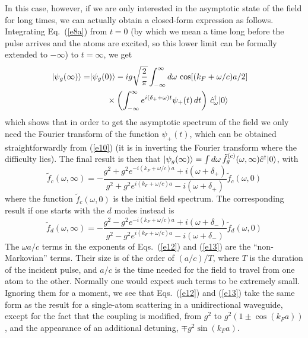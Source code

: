 \documentclass[aps,pra,twocolumn,floatfix,superscriptaddress]{revtex4}
\begin{document}
In this case, however, if we are only interested in the asymptotic state of the field for long times, we can actually obtain a closed-form expression as follows.  Integrating Eq.~(\ref{e8a}) from $t=0$ (by which we mean a time long before the pulse arrives and the atoms are excited, so this lower limit can be formally extended to $-\infty$) to $t=\infty$, we get 
\begin{align}
|\psi_{g}(\infty)\rangle = &|\psi_{g}(0)\rangle-ig \sqrt{\frac 2 \pi} \int_{-\infty}^\infty d\omega\, \cos[(k_F +\omega/c)a/2] \cr
&\qquad\times\left( \int_{-\infty}^\infty e^{i(\delta_+ +\omega)t} \psi_+(t)\, dt\right)\, \hat c_\omega^\dagger |0\rangle
\label{e11}
\end{align}
which shows that in order to get the asymptotic spectrum of the field we only need the Fourier transform of the function $\psi_+(t)$, which can be obtained straightforwardly from (\ref{e10}) (it is in inverting the Fourier transform where the difficulty lies).  The final result is then that $|\psi_{g}(\infty)\rangle = \int d\omega\, \tilde f_g^{(c)}(\omega,\infty) \hat c^\dagger |0\rangle$, with
\begin{equation}
\tilde f_c(\omega,\infty) = -\frac{g^2+g^2 e^{-i(k_F+\omega/c)a} +i(\omega+\delta_+)}{g^2+g^2 e^{i(k_F+\omega/c)a} -i(\omega+\delta_+)}\tilde f_c(\omega,0)
\label{e12}
\end{equation}
where the function $\tilde f_c(\omega,0)$ is the initial field spectrum.  The corresponding result if one starts with the $d$ modes  instead is
\begin{equation}
\tilde f_d(\omega,\infty) = -\frac{g^2-g^2 e^{-i(k_F+\omega/c)a} +i(\omega+\delta_-)}{g^2-g^2 e^{i(k_F+\omega/c)a} -i(\omega+\delta_-)}\tilde f_d(\omega,0)
\label{e13}
\end{equation}
The $\omega a/c$ terms in the exponents of Eqs.~(\ref{e12}) and (\ref{e13}) are the ``non-Markovian'' terms.  Their size is of the order of $(a/c)/T$, where $T$ is the duration of the incident pulse, and $a/c$ is the time needed for the field to travel from one atom to the other.  Normally one would expect such terms to be extremely small.  Ignoring them for a moment, we see that Eqs.~(\ref{e12}) and (\ref{e13}) take the same form as the result for a single-atom scattering in a unidirectional waveguide, except for the fact that the coupling is modified, from $g^2$ to $g^2(1\pm\cos(k_F a))$, and the appearance of an additional detuning, $\mp g^2 \sin(k_F a)$.  
\end{document}
